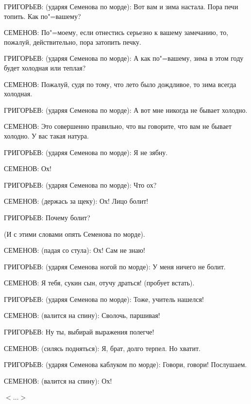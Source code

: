ГРИГОРЬЕВ: (ударяя Семенова по морде):
Вот вам и зима настала. Пора печи топить.
Как по"=вашему?

СЕМЕНОВ:
По"=моему, если отнестись серьезно к вашему замечанию, то,
пожалуй, действительно, пора затопить печку.

ГРИГОРЬЕВ: (ударяя Семенова по морде):
А как по"=вашему, зима в этом году будет холодная или теплая?

СЕМЕНОВ:
Пожалуй, судя по тому, что лето было дождливое, то зима всегда холодная.

ГРИГОРЬЕВ: (ударяя Семенова по морде):
А вот мне никогда не бывает холодно.

СЕМЕНОВ:
Это совершенно правильно, что вы говорите, что вам не бывает холодно. У вас такая натура.

ГРИГОРЬЕВ: (ударяя Семенова по морде):
Я не зябну.

СЕМЕНОВ:
Ох!

ГРИГОРЬЕВ: (ударяя Семенова по морде):
Что ох?

СЕМЕНОВ: (держась за щеку):
Ох! Лицо болит!

ГРИГОРЬЕВ:
Почему болит?

(И с этими словами опять Семенова по морде).

СЕМЕНОВ: (падая со стула):
Ох! Сам не знаю!

ГРИГОРЬЕВ: (ударяя Семенова ногой по морде):
У меня ничего не болит.

СЕМЕНОВ:
Я тебя, сукин сын, отучу драться! (пробует встать).

ГРИГОРЬЕВ: (ударяя Семенова по морде):
Тоже, учитель нашелся!

СЕМЕНОВ: (валится на спину):
Сволочь, паршивая!

ГРИГОРЬЕВ:
Ну ты, выбирай выражения полегче!

СЕМЕНОВ: (силясь подняться):
Я, брат, долго терпел. Но хватит.

ГРИГОРЬЕВ: (ударяя Семенова каблуком по морде):
Говори, говори! Послушаем.

СЕМЕНОВ: (валится на спину):
Ох!

\begin{flushright}
	$<\dots>$
\end{flushright}